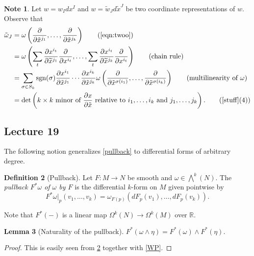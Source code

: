 \documentclass[10pt,letterpaper,cm]{nupset}
\theoremstyle{definition}
\newtheorem{definition}{Definition}[subsection]
\newtheorem{note}[definition]{Note}
\theoremstyle{theorem}
\newtheorem{lemma}[definition]{Lemma}
\theoremstyle{remark}
\newcommand{\R}{\mathbb R}
\newcommand{\1}{\mathbf{1}}
\newcommand{\0}{\vec 0}
\DeclareMathOperator{\sgn}{sgn}
\begin{document}
\begin{note}
Let $w = w_Idx^I$ and $ w= \tilde{w}_J d\tilde{x}^J$ be two coordinate representations of $w$.  Observe that 
\begin{align*}
\tilde{\omega}_J & = \omega\left(\frac{\partial}{\partial{\tilde{x}^{j_1}}}, \ldots,  \frac{\partial}{\partial{\tilde{x}^{j_k}}}\right)  \tag{\eqref{eqn:twoo}}
\\ & = \omega\left(\sum_{t} \frac{\partial x^{i_t}}{\partial \widetilde{x}^{j_{1}}} \frac{\partial}{\partial x^{i_t}}, \ldots, \sum_{t} \frac{\partial x^{i_t}}{\partial \widetilde{x}^{j_{k}}} \frac{\partial}{\partial x^{i_t}}\right) \tag{\text{chain rule}}
\\ & = \sum_{\sigma\in S_k}\sgn(\sigma)\frac{\partial{x^{i_1}}}{\partial{\tilde{x}^{j_1}}}\cdots \frac{\partial{x^{i_k}}}{\partial{\tilde{x}^{j_k}}}\omega\left(\frac{\partial}{\partial{\tilde{x}^{\sigma(i_1)}}}, \ldots, \frac{\partial}{\partial{\tilde{x}^{\sigma(i_k)}}} \right)  \tag{\text{multilinearity} of $\omega$}
\\ & =  \det\left(k \times k \text{ minor of }\frac{\partial{x}}{\partial{\tilde{x}}} \text{ relative to } i_1, \ldots, i_k \text{ and }j_1, \ldots, j_k\right). \tag{\cref{stuff}(4)}
\end{align*}
\end{note} 

\subsection{Lecture 19}

The following notion generalizes \cref{pullback} to differential forms of arbitrary degree.

\begin{definition}[Pullback]\label{PB}
Let $F: M \to N$ be smooth and $\omega \in \bigwedge^k(N)$.  The \textit{pullback $F^{\ast}\omega$ of $\omega$ by $F$} is the differential $k$-form on $M$ given pointwise by 
\[ 
F^{\ast} \omega\bigr\rvert_p(v_1, \ldots, v_k) = \omega_{F(p)}\left(dF_p(v_1), \ldots, dF_p(v_k)\right). 
\]
\end{definition}



Note that  $F^{\ast}(-)$ is a linear map $\Omega^k(N) \to \Omega^k(M)$ over $\R$. 


\begin{lemma}[Naturality of the pullback]
$F^{\ast}\left(\omega \wedge \eta\right) = F^{\ast}\left(\omega\right) \wedge F^{\ast}\left(\eta\right).$
\end{lemma}
\begin{proof}
This is easily seen from \cref{PB} together with \cref{WP}.
\end{proof}
\end{document}
